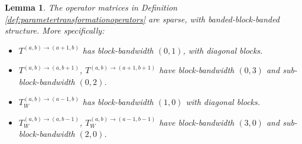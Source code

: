 \documentclass[11pt, oneside]{article}   	%
\newtheorem{lemma}{Lemma}
\begin{document}
\begin{lemma}\label{lemma:sparsityofparametertransformationoperators}
The operator matrices in Definition \ref{def:parametertransformationoperators} are sparse, with banded-block-banded structure. More specifically:
\begin{itemize}
	\item $T^{(a,b)\to(a+1,b)}$ has block-bandwidth $(0,1)$, with diagonal blocks.
  	\item $T^{(a,b)\to(a,b+1)}$, $T^{(a,b)\to(a+1,b+1)}$ have block-bandwidth $(0,3)$ and sub-block-bandwidth $(0,2)$.
	\item $T_W^{(a,b)\to(a-1,b)}$ has block-bandwidth  $(1,0)$ with diagonal blocks.
  	\item $T_W^{(a,b)\to(a,b-1)}$, $T_W^{(a,b)\to(a-1,b-1)}$ have block-bandwidth $(3,0)$ and sub-block-bandwidth $(2,0)$.
\end{itemize}
\end{lemma}
\end{document}
